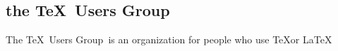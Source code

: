 \documentclass{article}
\newcommand{\TUG}{\TeX\ Users Group}
\begin{document}
	\begin{center}
	\section{the \TUG}
	The \TUG\ is an organization for people who use 
	\TeX or  \LaTeX
	\end{center}
	
\end{document}
